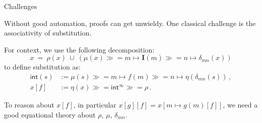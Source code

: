 \documentclass{beamer}
\newcommand{\bind}{\gg\!\!=}
\begin{document}
\begin{frame}{Challenges} %

Without good automation,
proofs can get unwieldy.
One classical challenge is
the associativity of substitution.
\vfill

For context, we use the following decomposition:
\[
    x \: = \: \rho(x) \: \cup \:
        (\mu(x) \bind m \mapsto \mathbf{I}(m) \bind n \mapsto \delta_{mn}(x))
\]
to define substitution as:
\begin{align*}
    \mathsf{int}(s) &:= 
      \mu(s) \bind m \mapsto f(m) \bind n \mapsto \eta(\delta_{mn}(s)) \,, \\
    x[f] &:=
      \eta(x) \bind \mathsf{int}^\infty \bind \rho \,.
\end{align*}
\vfill

To reason about $x[f]$,
in particular $x[g][f] = x[m \mapsto g(m)[f]]$,
we need a good equational theory about $\rho$, $\mu$, $\delta_{mn}$.

\end{frame}
\end{document}
